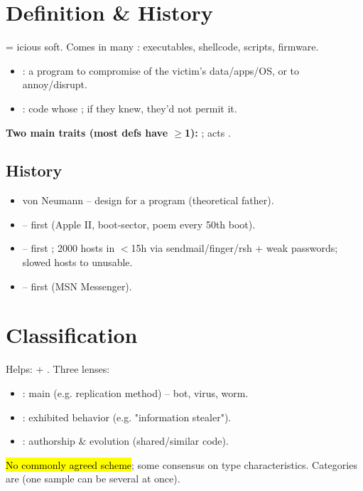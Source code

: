 

\section{Definition \& History}
 = icious soft. Comes in many : executables, shellcode, scripts, firmware.
\begin{itemize}
\item {}: a program  to compromise  of the victim's data/apps/OS, or to annoy/disrupt.
\item {}: code whose ; if they knew, they'd not permit it.
\end{itemize}
\textbf{Two main traits (most defs have $\geq$1):} ; acts .

\subsection{History}
\begin{itemize}
\item {} von Neumann -- design for a  program (theoretical father).
\item {} -- first  (Apple II, boot-sector, poem every 50th boot).
\item {} -- first ; 2000 hosts in $<$15h via sendmail/finger/rsh + weak passwords;  slowed hosts to unusable.
\item {} -- first  (MSN Messenger).
\end{itemize}

\section{Classification}
Helps:  + . Three lenses:
\begin{itemize}
\item {}: main  (e.g. replication method) -- bot, virus, worm.
\item {}: exhibited behavior (e.g. "information stealer").
\item {}: authorship \& evolution (shared/similar code).
\end{itemize}
\hl{No commonly agreed scheme}; some consensus on type characteristics. Categories are  (one sample can be several at once).

